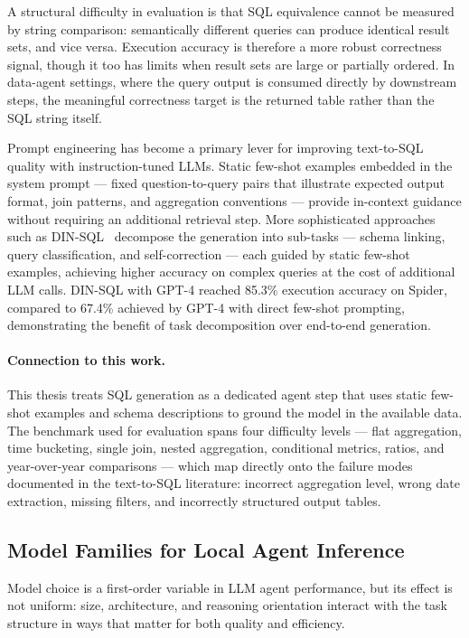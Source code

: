 A structural difficulty in evaluation is that SQL equivalence cannot be measured
by string comparison: semantically different queries can produce identical result
sets, and vice versa.
Execution accuracy is therefore a more robust correctness signal, though it too
has limits when result sets are large or partially ordered.
In data-agent settings, where the query output is consumed directly by downstream
steps, the meaningful correctness target is the returned table rather than the
SQL string itself.

Prompt engineering has become a primary lever for improving text-to-SQL quality
with instruction-tuned LLMs.
Static few-shot examples embedded in the system prompt --- fixed
question-to-query pairs that illustrate expected output format, join patterns,
and aggregation conventions --- provide in-context guidance without requiring
an additional retrieval step.
More sophisticated approaches such as DIN-SQL~\cite{pourreza2023dinsql} decompose
the generation into sub-tasks --- schema linking, query classification, and
self-correction --- each guided by static few-shot examples,
achieving higher accuracy on complex queries at the cost of additional LLM calls.
DIN-SQL with GPT-4 reached 85.3\% execution accuracy on Spider, compared to
67.4\% achieved by GPT-4 with direct few-shot prompting, demonstrating the
benefit of task decomposition over end-to-end generation.

\paragraph{Connection to this work.}
This thesis treats SQL generation as a dedicated agent step that uses static
few-shot examples and schema descriptions to ground the model in the available
data.
The benchmark used for evaluation spans four difficulty levels --- flat
aggregation, time bucketing, single join, nested aggregation, conditional
metrics, ratios, and year-over-year comparisons --- which map directly onto
the failure modes documented in the text-to-SQL literature: incorrect
aggregation level, wrong date extraction, missing filters, and incorrectly
structured output tables.

\subsection{Model Families for Local Agent Inference}\label{sec:model-families}

Model choice is a first-order variable in LLM agent performance, but its
effect is not uniform: size, architecture, and reasoning orientation interact
with the task structure in ways that matter for both quality and efficiency.

